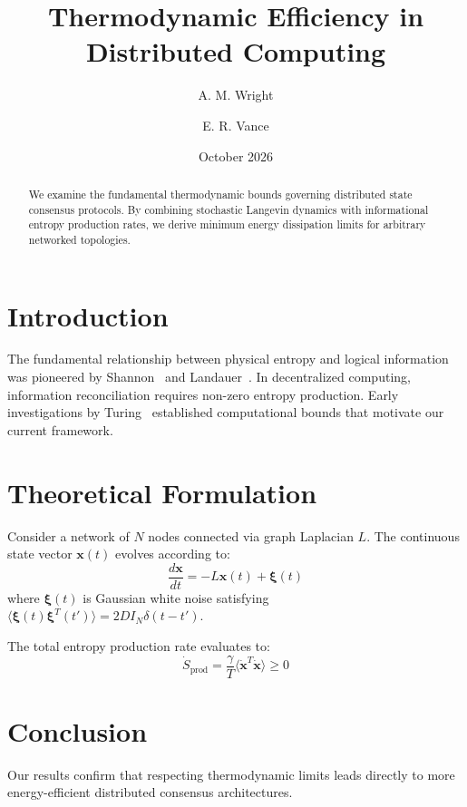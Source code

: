 \documentclass[11pt,a4paper]{article}
\title{Thermodynamic Efficiency in Distributed Computing}
\author{A. M. Wright \and E. R. Vance}
\date{October 2026}
\begin{document}
\maketitle

\begin{abstract}
We examine the fundamental thermodynamic bounds governing distributed state consensus protocols. By combining stochastic Langevin dynamics with informational entropy production rates, we derive minimum energy dissipation limits for arbitrary networked topologies.
\end{abstract}

\section{Introduction}
The fundamental relationship between physical entropy and logical information was pioneered by Shannon~\cite{shannon1948} and Landauer~\cite{landauer1961}. In decentralized computing, information reconciliation requires non-zero entropy production. Early investigations by Turing~\cite{turing1936} established computational bounds that motivate our current framework.

\section{Theoretical Formulation}
Consider a network of $N$ nodes connected via graph Laplacian $L$. The continuous state vector $\mathbf{x}(t)$ evolves according to:
\begin{equation}
  \frac{d\mathbf{x}}{dt} = -L \mathbf{x}(t) + \boldsymbol{\xi}(t)
  \label{eq:langevin}
\end{equation}
where $\boldsymbol{\xi}(t)$ is Gaussian white noise satisfying $\langle \boldsymbol{\xi}(t) \boldsymbol{\xi}^T(t') \rangle = 2 D I_N \delta(t - t')$.

The total entropy production rate evaluates to:
\begin{equation}
  \dot{S}_{\text{prod}} = \frac{\gamma}{T} \langle \dot{\mathbf{x}}^T \dot{\mathbf{x}} \rangle \ge 0
  \label{eq:entropy_rate}
\end{equation}

\section{Conclusion}
Our results confirm that respecting thermodynamic limits leads directly to more energy-efficient distributed consensus architectures.



\end{document}
